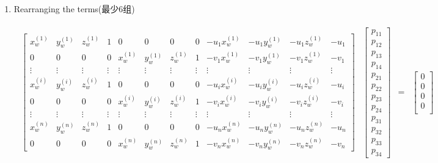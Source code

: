 \begin{enumerate}
    \item Rearranging the terms(最少6组)
    \addtocounter{MaxMatrixCols}{15}
    \begin{align*}
        \begin{array}{cccc}
            \begin{bmatrix}
            x_{w}^{(1)} & y_{w}^{(1)} & z_{w}^{(1)} & 1 & 0 & 0 & 0 & 0 & -u_{1} x_{w}^{(1)} & -u_{1} y_{w}^{(1)} & -u_{1} z_{w}^{(1)} & -u_{1} \\
            0 & 0 & 0 & 0 & x_{w}^{(1)} & y_{w}^{(1)} & z_{w}^{(1)} & 1 & -v_{1} x_{w}^{(1)} & -v_{1} y_{w}^{(1)} & -v_{1} z_{w}^{(1)} & -v_{1} \\
            \vdots & \vdots & \vdots & \vdots & \vdots & \vdots & \vdots & \vdots & \vdots & \vdots & \vdots & \vdots \\
            x_{w}^{(i)} & y_{w}^{(i)} & z_{w}^{(i)} & 1 & 0 & 0 & 0 & 0 & -u_{i} x_{w}^{(i)} & -u_{i} y_{w}^{(i)} & -u_{i} z_{w}^{(i)} & -u_{i} \\
            0 & 0 & 0 & 0 & x_{w}^{(i)} & y_{w}^{(i)} & z_{w}^{(i)} & 1 & -v_{i} x_{w}^{(i)} & -v_{i} y_{w}^{(i)} & -v_{i} z_{w}^{(i)} & -v_{i} \\
            \vdots & \vdots & \vdots & \vdots & \vdots & \vdots & \vdots & \vdots & \vdots & \vdots & \vdots & \vdots \\
            x_{w}^{(n)} & y_{w}^{(n)} & z_{w}^{(n)} & 1 & 0 & 0 & 0 & 0 & -u_{n} x_{w}^{(n)} & -u_{n} y_{w}^{(n)} & -u_{n} z_{w}^{(n)} & -u_{n} \\
            0 & 0 & 0 & 0 & x_{w}^{(n)} & y_{w}^{(n)} & z_{w}^{(n)} & 1 & -v_{n} x_{w}^{(n)} & -v_{n} y_{w}^{(n)} & -v_{n} z_{w}^{(n)} & -v_{n}
            \end{bmatrix} &
            \begin{bmatrix}
                p_{11}\\ p_{12} \\p_{13}\\p_{14}\\p_{21}\\p_{22}\\p_{23}\\p_{24}\\p_{31}\\p_{32}\\p_{33}\\p_{34}
            \end{bmatrix}
            &=&\begin{bmatrix}
                0\\0\\0\\0\\

\end{bmatrix}
\end{array}
\end{align*}
\end{enumerate}
